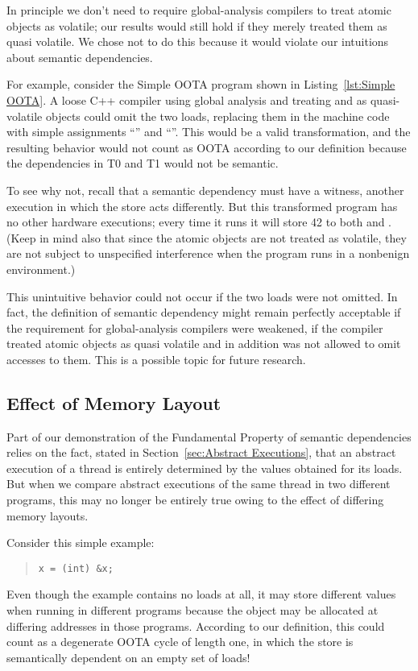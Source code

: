 In principle we don't need to require global-analysis compilers to
treat atomic objects as volatile; our results would still hold if they
merely treated them as quasi volatile.
We chose not to do this because it would violate our intuitions about
semantic dependencies.

For example, consider the Simple OOTA program shown in
Listing~\ref{lst:Simple OOTA}.
A loose C++ compiler using global analysis and treating  and  as
quasi-volatile objects could omit the two loads, replacing them in the
machine code with simple assignments ``'' and
``''.
This would be a valid transformation, and the resulting behavior would
not count as OOTA according to our definition because the
dependencies in T0 and T1 would not be semantic.

To see why not, recall that a semantic dependency must have a witness,
another execution in which the store acts differently.
But this transformed program has no other hardware executions; every time it
runs it will store 42 to both  and .
(Keep in mind also that since the atomic objects are not treated as
volatile, they are not subject to unspecified interference when the
program runs in a nonbenign environment.)

This unintuitive behavior could not occur if the two loads were not
omitted.
In fact, the definition of semantic dependency might remain
perfectly acceptable if the requirement for global-analysis compilers
were weakened, if the compiler treated atomic objects as quasi
volatile and in addition was not allowed to omit accesses to them.
This is a possible topic for future research.

\subsection{Effect of Memory Layout}
\label{sec:Effect of Memory Layout}

Part of our demonstration of the Fundamental Property of semantic
dependencies relies on the fact, stated in
Section~\ref{sec:Abstract Executions},
that an abstract execution of a thread is entirely determined by the
values obtained for its loads.
But when we compare abstract executions of the same thread in two
different programs, this may no longer be entirely true owing to the
effect of differing memory layouts.

Consider this simple example:
\begin{quote}
\begin{verbatim}
x = (int) &x;
\end{verbatim}
\end{quote}
Even though the example contains no loads at all, it may store
different values when running in different programs because the
object  may be allocated at differing addresses in those
programs.
According to our definition, this could count as a degenerate OOTA
cycle of length one, in which the store is semantically dependent on
an empty set of loads!

